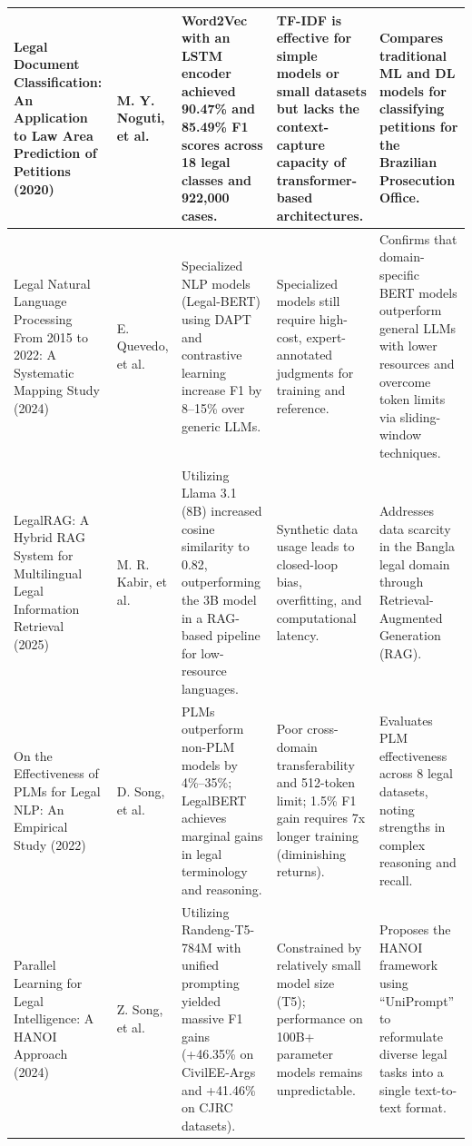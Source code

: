 {\begin{longtable}{|p{}|p{}|>{\raggedright\arraybackslash}p{}|>{\raggedright\arraybackslash}p{}|>{\raggedright\arraybackslash}p{}|}
Legal Document Classification: An Application to Law Area Prediction of Petitions (2020)~\cite{b18} & 
M. Y. Noguti, et al. & 
Word2Vec with an LSTM encoder achieved 90.47\% and 85.49\% F1 scores across 18 legal classes and 922,000 cases. & 
TF-IDF is effective for simple models or small datasets but lacks the context-capture capacity of transformer-based architectures. & 
Compares traditional ML and DL models for classifying petitions for the Brazilian Prosecution Office. \\ \hline


Legal Natural Language Processing From 2015 to 2022: A Systematic Mapping Study (2024)~\cite{b19} & 
E. Quevedo, et al. & 
Specialized NLP models (Legal-BERT) using DAPT and contrastive learning increase F1 by 8--15\% over generic LLMs. & 
Specialized models still require high-cost, expert-annotated judgments for training and reference. & 
Confirms that domain-specific BERT models outperform general LLMs with lower resources and overcome token limits via sliding-window techniques. \\ \hline


LegalRAG: A Hybrid RAG System for Multilingual Legal Information Retrieval (2025)~\cite{b20} & 
M. R. Kabir, et al. & 
Utilizing Llama 3.1 (8B) increased cosine similarity to 0.82, outperforming the 3B model in a RAG-based pipeline for low-resource languages. & 
Synthetic data usage leads to closed-loop bias, overfitting, and computational latency. & 
Addresses data scarcity in the Bangla legal domain through Retrieval-Augmented Generation (RAG). \\ \hline


On the Effectiveness of PLMs for Legal NLP: An Empirical Study (2022)~\cite{b21} & 
D. Song, et al. & 
PLMs outperform non-PLM models by 4\%--35\%; LegalBERT achieves marginal gains in legal terminology and reasoning. & 
Poor cross-domain transferability and 512-token limit; 1.5\% F1 gain requires 7x longer training (diminishing returns). & 
Evaluates PLM effectiveness across 8 legal datasets, noting strengths in complex reasoning and recall. \\ \hline


Parallel Learning for Legal Intelligence: A HANOI Approach (2024)~\cite{b22} & 
Z. Song, et al. & 
Utilizing Randeng-T5-784M with unified prompting yielded massive F1 gains (+46.35\% on CivilEE-Args and +41.46\% on CJRC datasets). & 
Constrained by relatively small model size (T5); performance on 100B+ parameter models remains unpredictable. & 
Proposes the HANOI framework using ``UniPrompt'' to reformulate diverse legal tasks into a single text-to-text format. \\ \hline



\end{longtable}}
